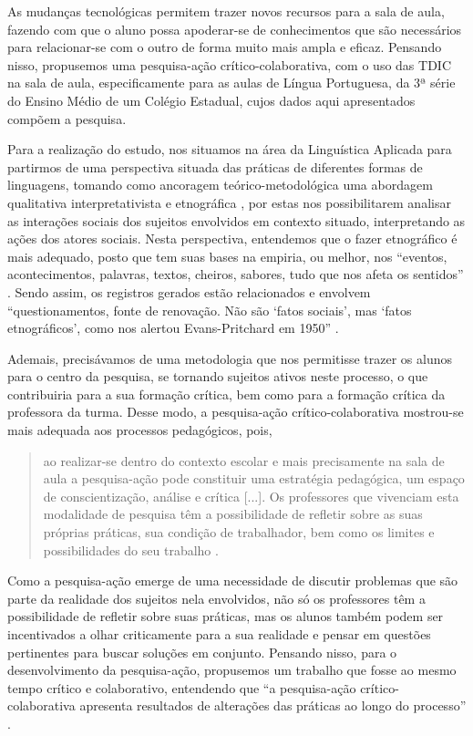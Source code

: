 \documentclass{textolivre}
\begin{document}
As mudanças tecnológicas permitem trazer novos recursos para a sala de aula, fazendo com que o aluno possa apoderar-se de conhecimentos que são necessários para relacionar-se com o outro de forma muito mais ampla e eficaz. Pensando nisso, propusemos uma pesquisa-ação crítico-colaborativa, com o uso das TDIC na sala de aula, especificamente para as aulas de Língua Portuguesa, da 3ª série do Ensino Médio de um Colégio Estadual, cujos dados aqui apresentados compõem a pesquisa.

Para a realização do estudo, nos situamos na área da Linguística Aplicada \cite{kleiman2007} para partirmos de uma perspectiva situada das práticas de diferentes formas de linguagens, tomando como ancoragem teórico-metodológica uma abordagem qualitativa interpretativista \cite{denzin2006} e etnográfica \cite{peirano2014}, por estas nos possibilitarem analisar as interações sociais dos sujeitos envolvidos em contexto situado, interpretando as ações dos atores sociais. Nesta perspectiva, entendemos que o fazer etnográfico é mais adequado, posto que tem suas bases na empiria, ou melhor, nos “eventos, acontecimentos, palavras, textos, cheiros, sabores, tudo que nos afeta os sentidos” \cite[p.~380]{peirano2014}. Sendo assim, os registros gerados estão relacionados e envolvem “questionamentos, fonte de renovação. Não são ‘fatos sociais’, mas ‘fatos etnográficos’, como nos alertou Evans-Pritchard em 1950” \cite[p.~380]{peirano2014}.

Ademais, precisávamos de uma metodologia que nos permitisse trazer os alunos para o centro da pesquisa, se tornando sujeitos ativos neste processo, o que contribuiria para a sua formação crítica, bem como para a formação crítica da professora da turma. Desse modo, a pesquisa-ação crítico-colaborativa mostrou-se mais adequada aos processos pedagógicos, pois,
\begin{quote}
ao realizar-se dentro do contexto escolar e mais precisamente na sala de aula a pesquisa-ação pode constituir uma estratégia pedagógica, um espaço de conscientização, análise e crítica [...]. Os professores que vivenciam esta modalidade de pesquisa têm a possibilidade de refletir sobre as suas próprias práticas, sua condição de trabalhador, bem como os limites e possibilidades do seu trabalho \cite[p.~526]{pimenta2005}.
\end{quote}

Como a pesquisa-ação emerge de uma necessidade de discutir problemas que são parte da realidade dos sujeitos nela envolvidos, não só os professores têm a possibilidade de refletir sobre suas práticas, mas os alunos também podem ser incentivados a olhar criticamente para a sua realidade e pensar em questões pertinentes para buscar soluções em conjunto. Pensando nisso, para o desenvolvimento da pesquisa-ação, propusemos um trabalho que fosse ao mesmo tempo crítico e colaborativo, entendendo que “a pesquisa-ação crítico-colaborativa apresenta resultados de alterações das práticas ao longo do processo” \cite[p.~536]{pimenta2005}.
\end{document}

